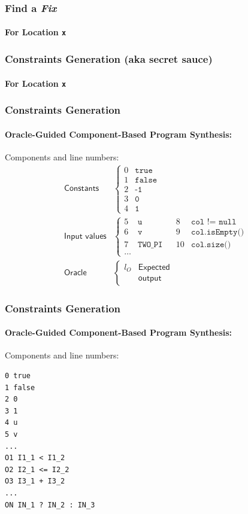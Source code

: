 \documentclass[onlymath]{beamer}
\begin{document}
\frame
{
  \frametitle{Find a \textit{Fix}}
  \framesubtitle{For Location \texttt{x}}
  \begin{center}
  
  \end{center}
}

\frame
{
  \frametitle{Constraints Generation (aka secret sauce)}
  \framesubtitle{For Location \texttt{x}}
  \begin{center}
  
  \end{center}
}

\begin{frame}
  \frametitle{Constraints Generation}
  \framesubtitle{Oracle-Guided Component-Based Program Synthesis:}
  Components and line numbers:
\begin{align*}
\textsf{Constants} & \left\{ \begin{array}{ll}
        0 & \texttt{true} \\
        1 & \texttt{false} \\
        2 & \texttt{-1} \\
        3 & \texttt{0} \\
        4 & \texttt{1}
    \end{array}\right. \\
\textsf{Input values} & \left\{ \begin{array}{lllll}
        5 & \texttt{u} & &		8 & \texttt{col != null} \\
        6 & \texttt{v} & &		9 & \texttt{col.isEmpty()} \\
        7 & \texttt{TWO\_PI} & &	10 & \texttt{col.size()} \\
        \dots
    \end{array}\right. \\
\textsf{Oracle} & \left\{ \begin{array}{ll}
        l_O &  \textsf{Expected} \\
            & \textsf{output}
    \end{array}\right.
\end{align*}
\end{frame}


\begin{frame}[fragile]
  \frametitle{Constraints Generation}
  \framesubtitle{Oracle-Guided Component-Based Program Synthesis:}
  Components and line numbers:
\begin{verbatim}
0 true
1 false
2 0
3 1
4 u
5 v
...
O1 I1_1 < I1_2
O2 I2_1 <= I2_2
O3 I3_1 + I3_2
...
ON IN_1 ? IN_2 : IN_3
\end{verbatim}
\end{frame}
\end{document}
